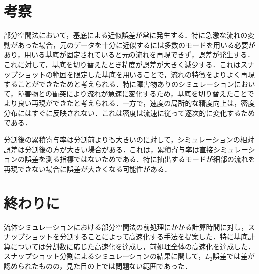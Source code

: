 \documentclass[uplatex,dvipdfmx,10pt,a4paper,notitlepage,oneside,twocolumn]{abst_jsarticle}
\begin{document}


\section{考察}
部分空間法において，基底による近似誤差が常に発生する．特に急激な流れの変動があった場合，元のデータを十分に近似するには多数のモードを用いる必要があり，用いる基底が固定されていると元の流れを再現できず，誤差が発生する．これに対して，基底を切り替えたとき精度が誤差が大きく減少する．これはスナップショットの範囲を限定した基底を用いることで，流れの特徴をよりよく再現することができたためと考えられる．特に障害物ありのシミュレーションにおいて，障害物との衝突により流れが急速に変化するため，基底を切り替えたことでより良い再現ができたと考えられる．一方で，速度の局所的な精度向上は，密度分布にはすぐに反映されない．これは密度は流速に従って逐次的に変化するためである．

分割後の累積寄与率は分割前よりも大きいのに対して，シミュレーションの相対誤差は分割後の方が大きい場合がある．これは，累積寄与率は直接シミュレーションの誤差を測る指標ではないためである．特に抽出するモードが細部の流れを再現できない場合に誤差が大きくなる可能性がある．

\section{終わりに}
流体シミュレーションにおける部分空間法の前処理にかかる計算時間に対し，スナップショットを分割することによって高速化する手法を提案した．特に基底計算については分割数に応じた高速化を達成し，前処理全体の高速化を達成した．スナップショット分割によるシミュレーションの結果に関して，$L_2$誤差では差が認められたものの，見た目の上では問題ない範囲であった．
\end{document}
